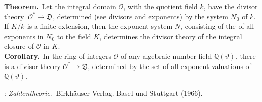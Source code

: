 \documentclass[12pt]{article}
\theoremstyle{definition}
\begin{document}
 
\textbf{Theorem.}\, Let the integral domain $\mathcal{O}$, with the quotient field $k$, have the divisor theory\, $\mathcal{O}^* \to \mathfrak{D}$, determined (see divisors and exponents) by the  system $N_0$ of $k$.\, If $K/k$ is a finite extension, then the exponent system $N$, consisting of the  of all exponents in $N_0$ to the field $K$, determines the divisor theory of the integral closure of $\mathcal{O}$ in $K$.\\


\textbf{Corollary.}\, In the ring of integers $\mathcal{O}$ of any algebraic number field $\mathbb{Q}(\vartheta)$, there is a divisor theory $\mathcal{O}^* \to \mathfrak{D}$, determined by the set of all exponent valuations of $\mathbb{Q}(\vartheta)$.

\begin{thebibliography}{9}
: {\em Zahlentheorie}.\, Birkh\"auser Verlag. Basel und Stuttgart (1966).
\end{thebibliography}
\end{document}
